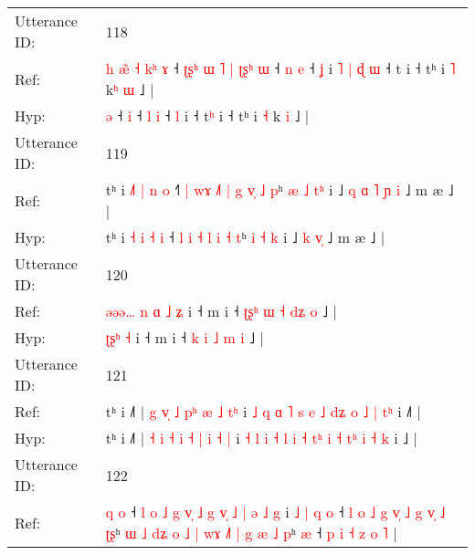 \documentclass[10pt]{article}
\DeclareRobustCommand{\hl}[1]{{\textcolor{red}{#1}}}
\begin{document}
\begin{longtable}{ll}
 \\
\midrule
Utterance ID: & 118 \\
Ref: & \hl{h}\hl{ }\hl{æ}\hl{̃}\hl{ }\hl{˧}\hl{ }\hl{k}\hl{ʰ}\hl{ }\hl{ɤ} ˧\hl{ }\hl{ʈ}\hl{ʂ}\hl{ʰ}\hl{ }\hl{ɯ}\hl{ }\hl{˥}\hl{ }\hl{|}\hl{ }\hl{ʈ}\hl{ʂ}\hl{ʰ} \hl{ɯ} ˧ \hl{n} \hl{e} ˧ \hl{ʝ} i\hl{ }\hl{˥}\hl{ }\hl{|}\hl{ }\hl{ɖ}\hl{ }\hl{ɯ} ˧ t\hl{} i ˧ tʰ i \hl{˥} k\hl{ʰ} \hl{ɯ} ˩ |
 \\
Hyp: & \hl{}\hl{}\hl{}\hl{}\hl{}\hl{}\hl{}\hl{}\hl{}\hl{}\hl{ə} ˧\hl{}\hl{}\hl{}\hl{}\hl{}\hl{}\hl{}\hl{}\hl{}\hl{}\hl{}\hl{}\hl{}\hl{} \hl{i} ˧ \hl{l} \hl{i} ˧ \hl{l} i\hl{}\hl{}\hl{}\hl{}\hl{}\hl{}\hl{}\hl{} ˧ t\hl{ʰ} i ˧ tʰ i \hl{˧} k\hl{} \hl{i} ˩ |
 \\
\midrule
Utterance ID: & 119 \\
Ref: & tʰ i \hl{˩}\hl{˥} \hl{|} \hl{n} \hl{o} ˧\hl{˥}\hl{ }\hl{|} \hl{w}\hl{ɤ} \hl{˩}\hl{˥} \hl{|} \hl{g} \hl{v}\hl{̩} \hl{˩} \hl{p}ʰ \hl{æ} \hl{˩} \hl{t}\hl{ʰ} i ˩\hl{ }\hl{q}\hl{ }\hl{ɑ} \hl{˥} \hl{ɲ}\hl{ }\hl{i} ˩ m æ ˩ |
 \\
Hyp: & tʰ i \hl{}\hl{˧} \hl{i} \hl{˧} \hl{i} ˧\hl{}\hl{}\hl{} \hl{}\hl{l} \hl{}\hl{i} \hl{˧} \hl{l} \hl{}\hl{i} \hl{˧} \hl{t}ʰ \hl{i} \hl{˧} \hl{}\hl{k} i ˩\hl{}\hl{}\hl{}\hl{} \hl{k} \hl{}\hl{v}\hl{̩} ˩ m æ ˩ |
 \\
\midrule
Utterance ID: & 120 \\
Ref: & \hl{ə}\hl{ə}\hl{ə}\hl{…}\hl{ }\hl{n}\hl{ }\hl{ɑ}\hl{ }\hl{˩} \hl{ʑ} i ˧ m i ˧ \hl{ʈ}\hl{ʂ}\hl{ʰ} \hl{ɯ} \hl{˧} \hl{d}\hl{ʑ} \hl{o} ˩ |
 \\
Hyp: & \hl{}\hl{}\hl{}\hl{}\hl{}\hl{}\hl{}\hl{ʈ}\hl{ʂ}\hl{ʰ} \hl{˧} i ˧ m i ˧ \hl{}\hl{}\hl{k} \hl{i} \hl{˩} \hl{}\hl{m} \hl{i} ˩ |
 \\
\midrule
Utterance ID: & 121 \\
Ref: & tʰ i ˩˥ | \hl{g} \hl{v}\hl{̩} \hl{˩} \hl{}\hl{p}\hl{ʰ} \hl{æ} \hl{˩} \hl{}\hl{t}\hl{ʰ} i \hl{˩} \hl{q} \hl{ɑ} \hl{˥} \hl{s} \hl{e} \hl{˩} \hl{}\hl{}\hl{d}\hl{ʑ} \hl{o} \hl{}\hl{˩} \hl{|} \hl{}\hl{t}\hl{ʰ} i ˩\hl{˥} |
 \\
Hyp: & tʰ i ˩˥ | \hl{˧} \hl{}\hl{i} \hl{˧} \hl{i}\hl{ }\hl{˧} \hl{|} \hl{i} \hl{˧}\hl{ }\hl{|} i \hl{˧} \hl{l} \hl{i} \hl{˧} \hl{l} \hl{i} \hl{˧} \hl{t}\hl{ʰ}\hl{ }\hl{i} \hl{˧} \hl{t}\hl{ʰ} \hl{i} \hl{˧}\hl{ }\hl{k} i ˩\hl{} |
 \\
\midrule
Utterance ID: & 122 \\
Ref: & \hl{}\hl{q} \hl{o} ˧ \hl{l} \hl{o} \hl{˩} \hl{g} \hl{v}\hl{̩} \hl{˩} \hl{g} \hl{v}\hl{̩}\hl{ }\hl{˩} \hl{|} \hl{ə} \hl{˩}\hl{ }\hl{g} i \hl{˩} \hl{|}\hl{ }\hl{q} \hl{o} ˧\hl{ }\hl{l} \hl{o}\hl{ }\hl{˩} \hl{g} \hl{v}\hl{̩} \hl{˩}\hl{ }\hl{g} \hl{v}\hl{̩} \hl{˩} \hl{ʈ}\hl{ʂ}ʰ\hl{ }\hl{ɯ}\hl{ }\hl{˩} \hl{d}\hl{ʑ} \hl{o} \hl{˩}\hl{ }\hl{|} \hl{w}\hl{ɤ} \hl{˩}\hl{˥} \hl{|}\hl{ }\hl{g} \hl{æ} \hl{˩} \hl{p}ʰ \hl{æ} ˧\hl{ }\hl{p}\hl{ }\hl{i} \hl{˧}\hl{ }\hl{z} \hl{o} \hl{˥} |

\end{longtable}
\end{document}
